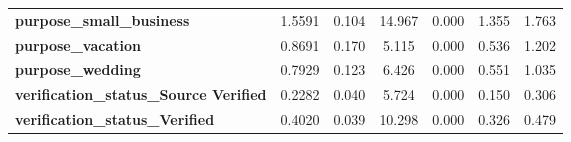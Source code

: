 \begin{center}
\begin{tabular}{lcccccc}
\textbf{purpose\_small\_business}              &       1.5591  &        0.104     &    14.967  &         0.000        &        1.355    &        1.763     \\
\textbf{purpose\_vacation}                     &       0.8691  &        0.170     &     5.115  &         0.000        &        0.536    &        1.202     \\
\textbf{purpose\_wedding}                      &       0.7929  &        0.123     &     6.426  &         0.000        &        0.551    &        1.035     \\
\textbf{verification\_status\_Source Verified} &       0.2282  &        0.040     &     5.724  &         0.000        &        0.150    &        0.306     \\
\textbf{verification\_status\_Verified}        &       0.4020  &        0.039     &    10.298  &         0.000        &        0.326    &        0.479     \\
\bottomrule
\end{tabular}
\end{center}